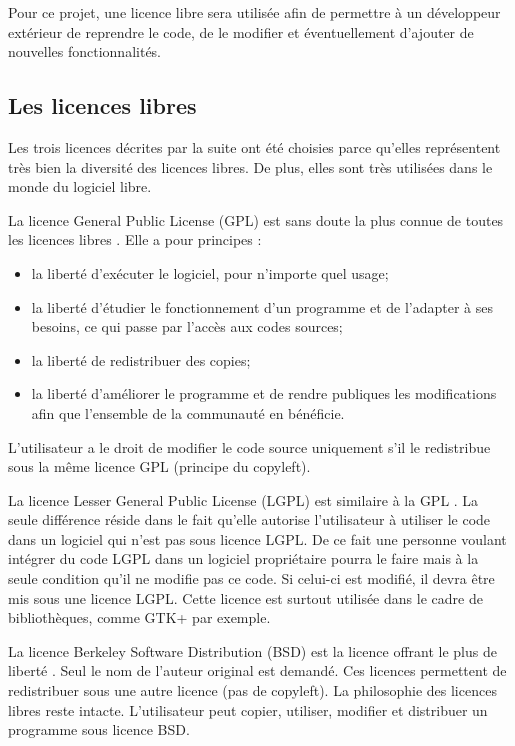 	Pour ce projet, une licence libre sera utilisée afin de permettre à un développeur extérieur de reprendre le code, de le modifier et éventuellement d'ajouter de nouvelles fonctionnalités.     


	\subsection{Les licences libres}
		Les trois licences décrites par la suite ont été choisies parce qu'elles représentent très bien la diversité des licences libres. De plus, elles sont très utilisées dans le monde du logiciel libre.

		La licence General Public License (GPL) est sans doute la plus connue de toutes les licences libres \nocite{website:licenceGPL}. Elle a pour principes :
		\begin{itemize}
			\item la liberté d'exécuter le logiciel, pour n'importe quel usage; 
			\item la liberté d'étudier le fonctionnement d'un programme et de l'adapter à ses besoins, ce qui passe par l'accès aux codes sources;
			\item la liberté de redistribuer des copies;
			\item la liberté d'améliorer le programme et de rendre publiques les modifications afin que l'ensemble de la communauté en bénéficie.
		\end{itemize}

	L'utilisateur a le droit de modifier le code source uniquement s'il le redistribue sous la même licence GPL (principe du copyleft).

		La licence Lesser General Public License (LGPL) est similaire à la GPL \nocite{website:licenceLGPL}. La seule différence réside dans le fait qu'elle autorise l'utilisateur à utiliser le code dans un logiciel qui n'est pas sous licence LGPL. De ce fait une personne voulant intégrer du code LGPL dans un logiciel propriétaire pourra le faire mais à la seule condition qu'il ne modifie pas ce code. Si celui-ci est modifié, il devra être mis sous une licence LGPL. Cette licence est surtout utilisée dans le cadre de bibliothèques, comme GTK+ par exemple.

		La licence Berkeley Software Distribution (BSD) est la licence offrant le plus de liberté \nocite{website:licenceBSD}. Seul le nom de l'auteur original est demandé. Ces licences permettent de redistribuer sous une autre licence (pas de copyleft). La philosophie des licences libres reste intacte. L'utilisateur peut copier, utiliser, modifier et distribuer un programme sous licence BSD.


